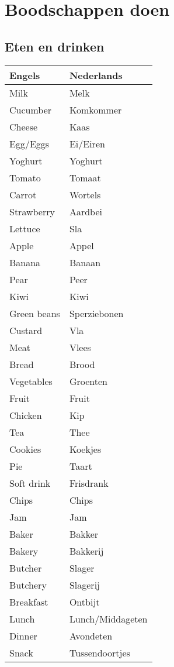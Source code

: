 \documentclass[a4paper,14pt]{extarticle}
\begin{document}
\section{Boodschappen doen}
\subsection{Eten en drinken}
\begin{paracol}{2}
\begin{tabularx}{200pt}{ p{100pt} p{100pt} }
 \hline
 Engels & Nederlands\\
 \hline
 Milk & Melk \\
 Cucumber & Komkommer \\
 Cheese & Kaas \\
 Egg/Eggs & Ei/Eiren \\
 Yoghurt & Yoghurt \\
 Tomato & Tomaat \\
 Carrot & Wortels \\
 Strawberry & Aardbei \\
 Lettuce & Sla \\
 Apple & Appel \\
 Banana & Banaan \\
 Pear & Peer \\
 Kiwi & Kiwi \\
 Green beans & Sperziebonen \\
 Custard & Vla \\
 Meat & Vlees \\
 Bread & Brood \\
 Vegetables & Groenten \\
 Fruit & Fruit \\
 Chicken & Kip \\
 Tea & Thee \\
 Cookies & Koekjes \\
 Pie & Taart \\
 Soft drink & Frisdrank \\
 Chips & Chips \\
 Jam & Jam \\
 Baker & Bakker \\
 Bakery & Bakkerij \\
 Butcher & Slager \\
 Butchery & Slagerij \\
 Breakfast & Ontbijt \\
 Lunch & Lunch/Middageten \\
 Dinner & Avondeten \\
 Snack & Tussendoortjes \\

\end{tabularx}
\end{paracol}
\end{document}
